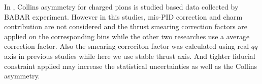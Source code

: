In \cite{BabarCharged}, Collins asymmetry for charged pions is studied based data collected by BABAR experiment. However in this studies, mis-PID correction and charm contribution are not considered and the thrust smearing correction factors are applied on the corresponding bins while the other two researches use a average correction factor. Also the smearing correciton factor was calculated using real $q\bar{q}$ axis in previous studies while here we use stable thrust axis. And tighter fiducial constraint applied may increase the statistical uncertainties as well as the Collins asymmetry.%

